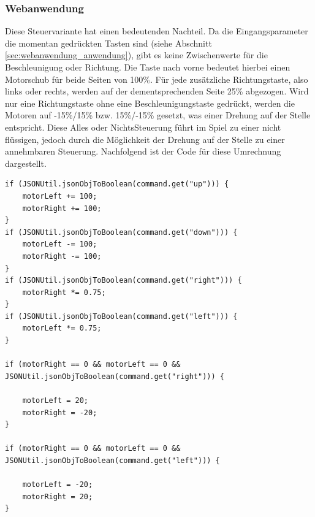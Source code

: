 \subsubsection{Webanwendung}
\label{sec:webanwendung_server}
Diese Steuervariante hat einen bedeutenden Nachteil. Da die Eingangsparameter die momentan gedrückten Tasten sind (siehe Abschnitt \ref{sec:webanwendung_anwendung}), gibt es keine Zwischenwerte für die Beschleunigung oder Richtung. Die Taste nach vorne bedeutet hierbei einen Motorschub für beide Seiten von 100\%. Für jede zusätzliche Richtungstaste, also links oder rechts, werden auf der dementsprechenden Seite 25\% abgezogen. Wird nur eine Richtungstaste ohne eine Beschleunigungstaste gedrückt, werden die Motoren auf -15\%/15\% bzw. 15\%/-15\% gesetzt, was einer Drehung auf der Stelle entspricht. Diese \glqq Alles oder Nichts\grqq Steuerung führt im Spiel zu einer nicht flüssigen, jedoch durch die Möglichkeit der Drehung auf der Stelle zu einer annehmbaren Steuerung. Nachfolgend ist der Code für diese Umrechnung dargestellt.
\begin{lstlisting}
if (JSONUtil.jsonObjToBoolean(command.get("up"))) {
	motorLeft += 100;
	motorRight += 100;
}
if (JSONUtil.jsonObjToBoolean(command.get("down"))) {
	motorLeft -= 100;
	motorRight -= 100;
}
if (JSONUtil.jsonObjToBoolean(command.get("right"))) {
	motorRight *= 0.75;
}
if (JSONUtil.jsonObjToBoolean(command.get("left"))) {
	motorLeft *= 0.75;
} 

if (motorRight == 0 && motorLeft == 0 &&
JSONUtil.jsonObjToBoolean(command.get("right"))) {

	motorLeft = 20;
	motorRight = -20;
}

if (motorRight == 0 && motorLeft == 0 &&
JSONUtil.jsonObjToBoolean(command.get("left"))) {

	motorLeft = -20;
	motorRight = 20;
}
\end{lstlisting}
 

